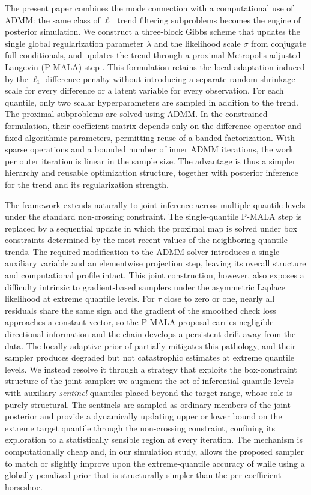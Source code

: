 The present paper combines the mode connection with a computational use of ADMM: the same class of $\ell_1$ trend filtering subproblems becomes the engine of posterior simulation. We construct a three-block Gibbs scheme that updates the single global regularization parameter $\lambda$ and the likelihood scale $\sigma$ from conjugate full conditionals, and updates the trend through a proximal Metropolis-adjusted Langevin (P-MALA) step \citep{pereyra2016proximal}. This formulation retains the local adaptation induced by the $\ell_1$ difference penalty without introducing a separate random shrinkage scale for every difference or a latent variable for every observation. For each quantile, only two scalar hyperparameters are sampled in addition to the trend. The proximal subproblems are solved using ADMM. In the constrained formulation, their coefficient matrix depends only on the difference operator and fixed algorithmic parameters, permitting reuse of a banded factorization. With sparse operations and a bounded number of inner ADMM iterations, the work per outer iteration is linear in the sample size. The advantage is thus a simpler hierarchy and reusable optimization structure, together with posterior inference for the trend and its regularization strength.

The framework extends naturally to joint inference across multiple quantile levels under the standard non-crossing constraint. The single-quantile P-MALA step is replaced by a sequential update in which the proximal map is solved under box constraints determined by the most recent values of the neighboring quantile trends. The required modification to the ADMM solver introduces a single auxiliary variable and an elementwise projection step, leaving its overall structure and computational profile intact. This joint construction, however, also exposes a difficulty intrinsic to gradient-based samplers under the asymmetric Laplace likelihood at extreme quantile levels. For $\tau$ close to zero or one, nearly all residuals share the same sign and the gradient of the smoothed check loss approaches a constant vector, so the P-MALA proposal carries negligible directional information and the chain develops a persistent drift away from the data. The locally adaptive prior of \citet{onizuka2024fast} partially mitigates this pathology, and their sampler produces degraded but not catastrophic estimates at extreme quantile levels. We instead resolve it through a strategy that exploits the box-constraint structure of the joint sampler: we augment the set of inferential quantile levels with auxiliary \emph{sentinel} quantiles placed beyond the target range, whose role is purely structural. The sentinels are sampled as ordinary members of the joint posterior and provide a dynamically updating upper or lower bound on the extreme target quantile through the non-crossing constraint, confining its exploration to a statistically sensible region at every iteration. The mechanism is computationally cheap and, in our simulation study, allows the proposed sampler to match or slightly improve upon the extreme-quantile accuracy of \citet{onizuka2024fast} while using a globally penalized prior that is structurally simpler than the per-coefficient horseshoe.

